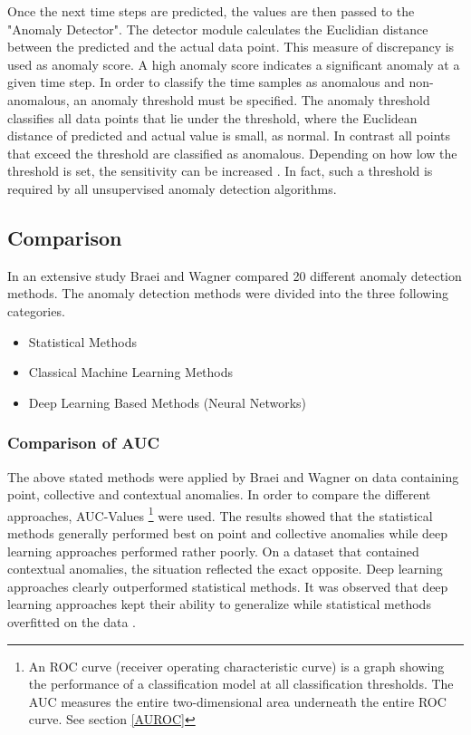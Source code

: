 Once the next time steps are predicted, the values are then passed to the "Anomaly Detector". The detector module calculates the Euclidian distance between the predicted and the actual data point. This measure of discrepancy is used as anomaly score. A high anomaly score indicates a significant anomaly at a given time step. In order to classify the time samples as anomalous and non-anomalous, an anomaly threshold must be specified. The anomaly threshold classifies all data points that lie under the threshold, where the Euclidean distance of predicted and actual value is small, as normal. In contrast all points that exceed the threshold are classified as anomalous. Depending on how low the threshold is set, the sensitivity can be increased \parencite{Munir2019}. In fact, such a threshold is required by all unsupervised anomaly detection algorithms. 

\clearpage
\subsection{Comparison} \label{comparison}
In an extensive study Braei and Wagner \parencite*{Braei2020} compared 20 different anomaly detection methods. The anomaly detection methods were divided into the three following  categories. 

\begin{itemize}
	\item Statistical Methods
	\item Classical Machine Learning Methods
	\item Deep Learning Based Methods (Neural Networks)
\end{itemize}


\subsubsection{Comparison of AUC}
The above stated methods were applied by Braei and Wagner \parencite*{Braei2020} on data containing point, collective and contextual anomalies. In order to compare the different approaches, AUC-Values \footnote{An ROC curve (receiver operating characteristic curve) is a graph showing the performance of a classification model at all classification thresholds. The AUC measures the entire two-dimensional area underneath the entire ROC curve. See section \ref{AUROC}} were used. The results showed that the statistical methods generally performed best on point and collective anomalies while deep learning approaches performed rather poorly. On a dataset that contained contextual anomalies, the situation reflected the exact opposite. Deep learning approaches clearly outperformed statistical methods. It was observed that deep learning approaches kept their ability to generalize while statistical methods overfitted on the data \parencite{Braei2020}.

